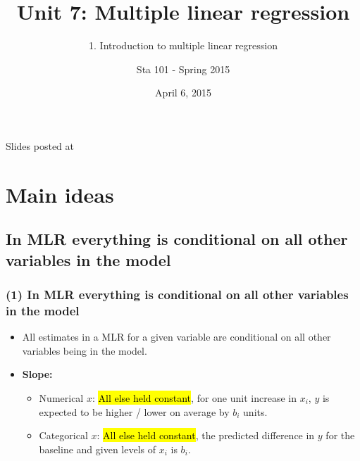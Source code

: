 \documentclass[11pt,containsverbatim,handout,xcolor=xelatex,dvipsnames,table]{beamer}
\title{Unit 7: Multiple linear regression}
\subtitle{1. Introduction to multiple linear regression }
\author{Sta 101 - Spring 2015}
\date{April 6, 2015}
\institute{Duke University, Department of Statistical Science}
\begin{document}


\begin{frame}[plain]

\titlepage
\vfill
{\scriptsize {} \hfill Slides posted at  \webLink{\CourseSite}{\CourseSite}}
\addtocounter{framenumber}{-1} 

\end{frame}


%
%
%
%
%
%


\section{Main ideas}


\subsection{In MLR everything is conditional on all other variables in the model}
\label{mi1}


\begin{frame}[fragile]
\frametitle{(1) In MLR everything is conditional on all other variables in the model}

\begin{itemize}

\item All estimates in a MLR for a given variable are conditional on all other variables being in the model.

\item \textbf{Slope:} 
\begin{itemize}
\item Numerical $x$: \hl{All else held constant}, for one unit increase in $x_i$, $y$ is expected to be higher / lower on average by $b_i$ units.
\item Categorical $x$: \hl{All else held constant}, the predicted difference in $y$ for the baseline and given levels of $x_i$ is $b_i$.
\end{itemize}

\end{itemize}

\end{frame}
\end{document}
